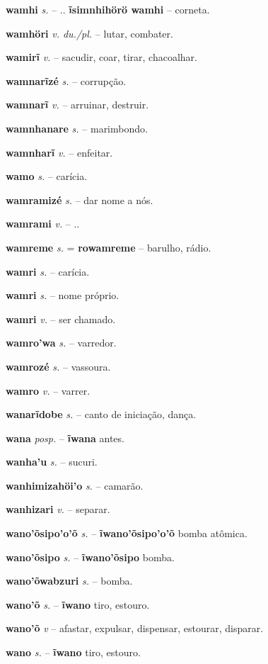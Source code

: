 \textbf{wamhi} \textit{s.} -- .. \textbf{ĩsimnhihörö wamhi} -- corneta.

\textbf{wamhöri} \textit{v. du./pl.} -- lutar, combater.

\textbf{wamirĩ} \textit{v.} -- sacudir, coar, tirar, chacoalhar.

\textbf{wamnarĩzé} \textit{s.} -- corrupção.

\textbf{wamnarĩ} \textit{v.} -- arruinar, destruir.

\textbf{wamnhanare} \textit{s.} -- marimbondo.

\textbf{wamnharĩ} \textit{v.} -- enfeitar.

\textbf{wamo} \textit{s.} -- carícia.

\textbf{wamramizé} \textit{s.} -- dar nome a nós.

\textbf{wamrami} \textit{v.} -- ..

\textbf{wamreme} \textit{s.} = \textbf{rowamreme} -- barulho, rádio.

\textbf{wamri} \textit{s.} -- carícia.

\textbf{wamri} \textit{s.} -- nome próprio.

\textbf{wamri} \textit{v.} -- ser chamado.

\textbf{wamro'wa} \textit{s.} -- varredor.

\textbf{wamrozé} \textit{s.} -- vassoura.

\textbf{wamro} \textit{v.} -- varrer.

\textbf{wanarĩdobe} \textit{s.} -- canto de iniciação, dança.

\textbf{wana} \textit{posp.} -- \textbf{ĩwana} antes.

\textbf{wanha'u} \textit{s.} -- sucuri.

\textbf{wanhimizahöi'o} \textit{s.} -- camarão.

\textbf{wanhizari} \textit{v.} -- separar.

\textbf{wano'õsipo'o'õ} \textit{s.} -- \textbf{ĩwano'õsipo'o'õ} bomba atômica.

\textbf{wano'õsipo} \textit{s.} -- \textbf{ĩwano'õsipo} bomba.

\textbf{wano'õwabzuri} \textit{s.} -- bomba.

\textbf{wano'õ} \textit{s.} -- \textbf{ĩwano} tiro, estouro.

\textbf{wano'õ} \textit{v} -- afastar, expulsar, dispensar, estourar, disparar.

\textbf{wano} \textit{s.} -- \textbf{ĩwano} tiro, estouro.

